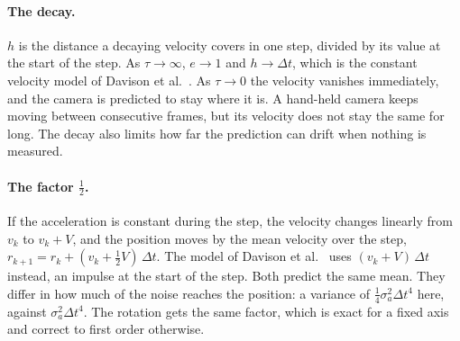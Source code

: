 \documentclass[11pt]{article}
\newcommand{\dt}{\Delta t}
\begin{document}
\paragraph{The decay.}
$h$ is the distance a decaying velocity covers in one step, divided by its value at the start of
the step. As $\tau \to \infty$, $e \to 1$ and $h \to \dt$, which is the constant velocity model of
Davison et al.~\cite{davison2007}. As $\tau \to 0$ the velocity vanishes immediately, and the
camera is predicted to stay where it is. A hand-held camera keeps moving between consecutive
frames, but its velocity does not stay the same for long. The decay also limits how far the prediction can drift
when nothing is measured.

\paragraph{The factor $\frac{1}{2}$.}
If the acceleration is constant during the step, the velocity changes linearly from $v_k$ to
$v_k + V$, and the position moves by the mean velocity over the step,
$r_{k+1} = r_k + (v_k + \frac{1}{2} V)\, \dt$. The model of Davison et al.~\cite{davison2007} uses
$(v_k + V)\, \dt$ instead, an impulse at the start of the step. Both predict the same mean. They
differ in how much of the noise reaches the position: a variance of $\frac{1}{4} \sigma_a^2 \dt^4$
here, against $\sigma_a^2 \dt^4$. The rotation gets the same factor, which is exact for a fixed
axis and correct to first order otherwise.
\end{document}

